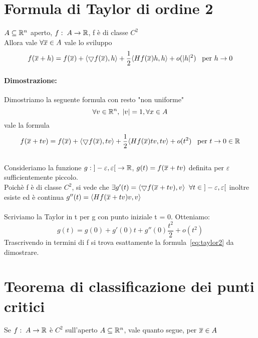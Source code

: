 \documentclass[12pt]{article}
\begin{document}
\section{Formula di Taylor di ordine 2}

$A\subseteq \mathbb{R}^n$ aperto, $f:\;A\rightarrow \mathbb{R}$, f è di classe $C^2$\\
Allora vale $\forall \overline{x} \in A$ vale lo sviluppo
$$f(\overline{x} + h) = f(\overline{x}) + \langle \bigtriangledown f(\overline{x}), h \rangle + \frac{1}{2}\langle Hf(\overline{x})h, h \rangle + o(\rvert h \rvert ^2)\;\;\;\text{per } h\rightarrow 0$$

\paragraph*{Dimostrazione:}
Dimostriamo la seguente formula con resto "non uniforme"
$$\forall v \in \mathbb{R} ^n,\; \rvert v\rvert = 1, \forall x \in A$$
vale la formula
\begin{equation}\label{eq:taylor2}
    f(\overline{x} + tv) = f(\overline{x}) + \langle \bigtriangledown f(\overline{x}), tv \rangle + \frac{1}{2}\langle Hf(\overline{x})tv, tv \rangle + o(t ^2)\;\;\;\text{per } t\rightarrow 0 \in \mathbb{R}
\end{equation}
\\
Consideriamo la funzione $g:\;]-\varepsilon, \varepsilon[ \;\rightarrow \mathbb{R}$, $g(t) = f(\overline{x} + tv)$
            definita per $\varepsilon$  sufficientemente piccolo. \\
            Poichè f è di classe $C^2$, si vede che
        $\exists g'(t) = \langle \bigtriangledown f(\overline{x}+tv), v \rangle\;\;\forall t \in \;]-\varepsilon, \varepsilon[$
inoltre esiste ed è  continua $g''(t) = \langle Hf(\overline{x}+tv)v, v \rangle$
\\\\
Scriviamo la Taylor in t per g con punto iniziale t = 0. Otteniamo:
$$g(t) = g(0) + g'(0)t + g''(0)\frac{t^2}{2} + o(t^2)$$
Trascrivendo in termini di f si trova esattamente la formula~\ref{eq:taylor2} da dimostrare.

\section{Teorema di classificazione dei punti critici}

Se $f:\; A \rightarrow \mathbb{R}$ è $C^2$ sull'aperto $A\subseteq \mathbb{R} ^n$, vale quanto segue, per $\overline{x} \in A$
\end{document}
